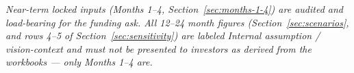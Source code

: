 \bigskip
\noindent\textit{Near-term locked inputs (Months 1--4, Section~\ref{sec:months-1-4}) are audited and load-bearing for the funding ask. All 12--24 month figures (Section~\ref{sec:scenarios}, and rows 4--5 of Section~\ref{sec:sensitivity}) are labeled Internal assumption / vision-context and must not be presented to investors as derived from the workbooks --- only Months 1--4 are.}
